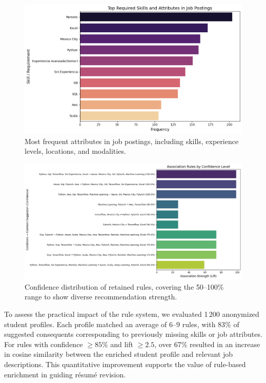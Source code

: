 \documentclass[runningheads]{llncs}
\begin{document}
	\begin{figure}[H]
		\centering
		\includegraphics[width=0.9\linewidth]{imagenes/frequent_attributes.png}
		\caption{Most frequent attributes in job postings, including skills, experience levels, locations, and modalities.}
		\label{fig:frequent_attrs}
	\end{figure}
	
	\begin{figure}[H]
		\centering
		\includegraphics[width=0.9\linewidth]{imagenes/confidence_distribution.png}
		\caption{Confidence distribution of retained rules, covering the 50–100\% range to show diverse recommendation strength.}
		\label{fig:confidence_distribution}
	\end{figure}
	
	To assess the practical impact of the rule system, we evaluated 1\,200 anonymized student profiles. Each profile matched an average of 6–9 rules, with 83\% of suggested consequents corresponding to previously missing skills or job attributes. For rules with confidence $\geq 85\%$ and lift $\geq 2.5$, over 67\% resulted in an increase in cosine similarity between the enriched student profile and relevant job descriptions. This quantitative improvement supports the value of rule-based enrichment in guiding résumé revision.
	
\end{document}
